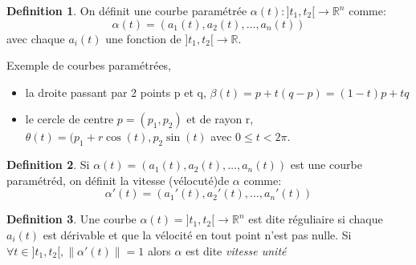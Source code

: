 \documentclass[]{book}
\theoremstyle{definition}
\newtheorem{defn}{Definition}
\newcommand{\bb}[1]{\mathbb{#1}}
\newcommand{\R}{\bb{R}}
\begin{document}
\begin{defn}
On d\'efinit une courbe param\'etr\'ee $\alpha(t): ]t_1,t_2[ \to \R^n$ comme:
$$\alpha(t) = (a_1(t), a_2(t), \ldots, a_n(t))$$
avec chaque $a_i(t)$ une fonction de $]t_1, t_2[ \to \R$. 
\end{defn}

Exemple de courbes param\'etr\'ees, 
\begin{itemize}
\item la droite passant par 2 points p et q, $\beta(t) = p +t(q-p) = (1-t)p + tq$
\item le cercle de centre $p = (p_1, p_2)$ et de rayon r, $\theta(t) = (p_1 + r\cos(t), p_2\sin(t)$ avec $0 \le t < 2\pi$.
\end{itemize}


\begin{defn}
Si $\alpha(t) = (a_1(t), a_2(t), \ldots, a_n(t))$ est une courbe param\'etr\'ed, on d\'efinit la vitesse (v\'elocut\'e)de $\alpha$  comme:
$$\alpha'(t) = (a_1'(t), a_2'(t), \ldots, a_n'(t))$$
\end{defn}

\begin{defn}
Une courbe $\alpha(t) = ]t_1, t_2[ \to \R^n$ est dite r\'eguliaire si chaque $a_i(t)$ est d\'erivable et que la v\'elocit\'e en tout point n'est pas nulle. Si $\forall t \in ]t_1, t_2[, \lVert \alpha'(t) \rVert = 1$ alors $\alpha$ est dite \emph{vitesse unit\'e}
\end{defn}
\end{document}
